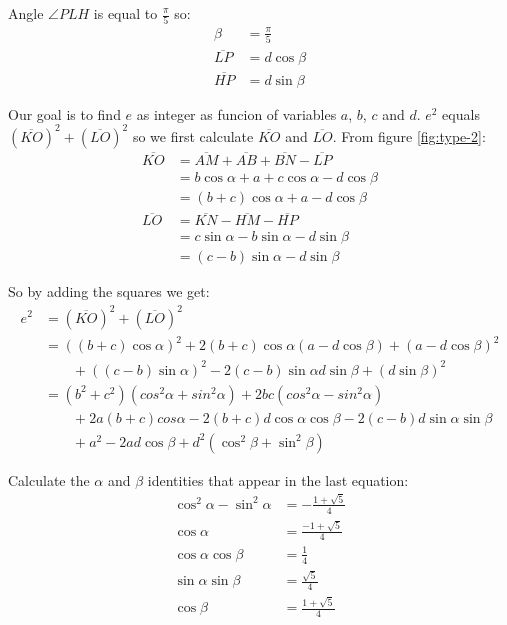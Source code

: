 \documentclass[11pt]{article}
\begin{document}
Angle $\angle{PLH}$ is equal to $\frac{\pi}{5}$ so:
\begin{align*}
\beta &= \frac{\pi}{5}\\
\overline{LP} &= d\cos{\beta}\\
\overline{HP} &= d\sin{\beta}
\end{align*}

Our goal is to find $e$ as integer as funcion of variables $a$, $b$, $c$ and $d$.
$e^2$ equals $(\overline{KO})^2 + (\overline{LO})^2$ so we first calculate 
$\overline{KO}$ and $\overline{LO}$. From figure \ref{fig:type-2}:
\begin{align*}
\overline{KO} &= \overline{AM} + \overline{AB} + \overline{BN} - \overline{LP}\\
              &= b\cos{\alpha} + a + c\cos{\alpha} - d\cos{\beta}\\
              &= (b+c)\cos{\alpha} + a  - d\cos{\beta}\\
\overline{LO} &= \overline{KN} - \overline{HM} - \overline{HP}\\
              &= c\sin{\alpha} - b\sin{\alpha} - d\sin{\beta}\\
              &= (c-b)\sin{\alpha} - d\sin{\beta}
\end{align*}

So by adding the squares we get:
\begin{align*}
e^2 &= (\overline{KO})^2 + (\overline{LO})^2\\
    &= ((b+c)\cos{\alpha})^2 + 2(b+c)\cos{\alpha}(a - d\cos{\beta}) + (a - d\cos{\beta})^2\\
    &\qquad + ((c-b)\sin{\alpha})^2 - 2(c-b)\sin{\alpha}d\sin{\beta} + (d\sin{\beta})^2\\
    &= (b^2+c^2)(cos^2{\alpha}+sin^2{\alpha}) + 2bc(cos^2{\alpha}-sin^2{\alpha})\\
    &\qquad + 2a(b+c)cos{\alpha} - 2(b+c)d\cos{\alpha}\cos{\beta} - 2(c-b)d\sin{\alpha}\sin{\beta}\\
    &\qquad + a^2 - 2ad\cos{\beta} + d^2(\cos^2{\beta} + \sin^2{\beta})
\end{align*}

Calculate the $\alpha$ and $\beta$ identities that appear in the last equation:
\begin{align*}
\cos^2{\alpha} - \sin^2{\alpha} &= -\frac{1 + \sqrt{5}}{4}\\
                   \cos{\alpha} &= \frac{-1+\sqrt{5}}{4}\\
        \cos{\alpha}\cos{\beta} &= \frac{1}{4}\\
        \sin{\alpha}\sin{\beta} &= \frac{\sqrt{5}}{4}\\
                    \cos{\beta} &= \frac{1+\sqrt{5}}{4}
\end{align*}
\end{document}
